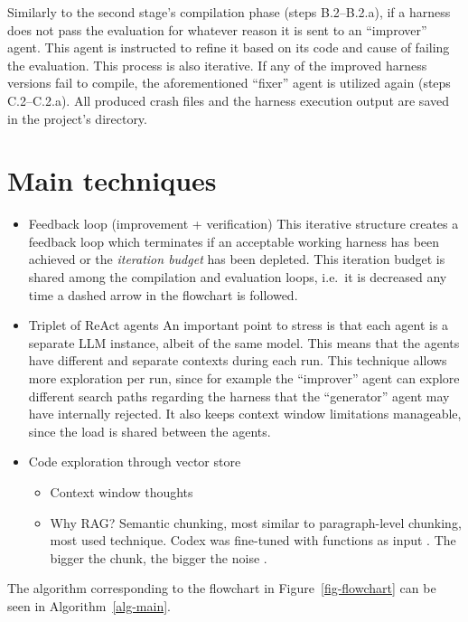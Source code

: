 \documentclass[
  a4paper,
  DIV=11,
  numbers=noendperiod]{scrreprt}
\providecommand{\tightlist}{%
  \setlength{\itemsep}{0pt}\setlength{\parskip}{0pt}}
\theoremstyle{definition}
\theoremstyle{remark}
\begin{document}
Similarly to the second stage's compilation phase (steps B.2--B.2.a), if
a harness does not pass the evaluation for whatever reason it is sent to
an ``improver'' agent. This agent is instructed to refine it based on
its code and cause of failing the evaluation. This process is also
iterative. If any of the improved harness versions fail to compile, the
aforementioned ``fixer'' agent is utilized again (steps C.2--C.2.a). All
produced crash files and the harness execution output are saved in the
project's directory.

\section{Main techniques}\label{main-techniques}

\begin{itemize}
\item
  Feedback loop (improvement + verification) This iterative structure
  creates a feedback loop which terminates if an acceptable working
  harness has been achieved or the \emph{iteration budget} has been
  depleted. This iteration budget is shared among the compilation and
  evaluation loops, i.e.~it is decreased any time a dashed arrow in the
  flowchart is followed.
\item
  Triplet of ReAct agents An important point to stress is that each
  agent is a separate LLM instance, albeit of the same model. This means
  that the agents have different and separate contexts during each run.
  This technique allows more exploration per run, since for example the
  ``improver'' agent can explore different search paths regarding the
  harness that the ``generator'' agent may have internally rejected. It
  also keeps context window limitations manageable, since the load is
  shared between the agents.
\item
  Code exploration through vector store

  \begin{itemize}
  \tightlist
  \item
    Context window thoughts
  \item
    Why RAG? Semantic chunking, most similar to paragraph-level
    chunking, most used technique. Codex was fine-tuned with functions
    as input \autocite{chen2021}. The bigger the chunk, the bigger the
    noise \autocite{zhao2024}.
  \end{itemize}
\end{itemize}

The algorithm corresponding to the flowchart in
Figure~\ref{fig-flowchart} can be seen in Algorithm~\ref{alg-main}.
\end{document}
